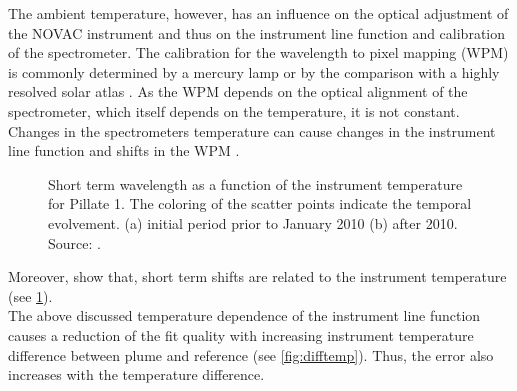 The ambient temperature, however, has an influence on the optical adjustment of the NOVAC instrument and thus on the instrument line function and calibration of the spectrometer.
The calibration for the wavelength to pixel mapping (WPM) is commonly determined by a mercury lamp or by the comparison with a highly resolved solar atlas \cite{chance2010improved}.
As the WPM depends on the optical alignment of the spectrometer, which itself depends on the temperature, it is not constant.
Changes in the spectrometers temperature can cause changes in the instrument line function and shifts in the WPM \citep{pinardi2007influence}. 
\begin{figure}        
    \caption{Short term wavelength as a function of the instrument temperature for Pillate 1. The coloring of the scatter points indicate the temporal evolvement. (a) initial period prior to January 2010 (b) after 2010. Source: \cite{WarnachSimon}.}
    \label{fig:shorttermshift}
\end{figure}
Moreover, \cite{WarnachSimon} show that, short term shifts are related to the instrument temperature (see \cref{fig:shorttermshift}).\\
The above discussed temperature dependence of the instrument line function causes a reduction of the fit quality with increasing instrument temperature difference between plume and reference (see \cref{fig:difftemp}). Thus, the  error also increases with the temperature difference.
